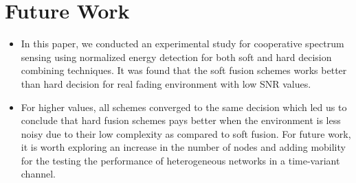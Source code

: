 \section{Future Work}
\begin{itemize}
\item In this paper, we conducted an experimental study for cooperative spectrum sensing using normalized energy detection for
both soft and hard decision combining techniques. It was found that the soft fusion schemes works better than hard decision for real fading environment with low SNR values. 

\item For higher values, all schemes converged to the same decision which led us to conclude that hard fusion schemes pays better when the environment is less noisy due to their low complexity as compared to soft fusion. For future work, it is worth exploring an increase in the number of nodes and adding mobility for the testing the performance of heterogeneous networks in a time-variant channel.

\end{itemize}
